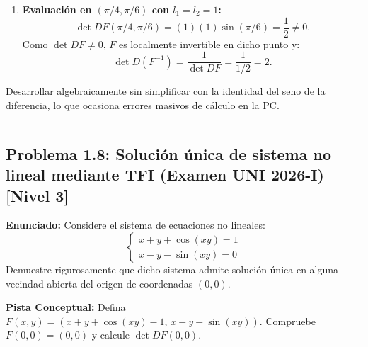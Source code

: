 \documentclass[11pt,a4paper]{article}
\begin{document}
\begin{enumerate}[label=\textbf{\arabic*.}]
\item \textbf{Evaluación en $(\pi/4, \pi/6)$ con $l_1 = l_2 = 1$:}
\begin{equation*}
\det DF(\pi/4, \pi/6) = (1)(1)\sin(\pi/6) = \frac{1}{2} \neq 0.
\end{equation*}
Como $\det DF \neq 0$, $F$ es localmente invertible en dicho punto y:
\begin{equation*}
\det D(F^{-1}) = \frac{1}{\det DF} = \frac{1}{1/2} = 2.
\end{equation*}
\end{enumerate}

\begin{trapbox}
Desarrollar algebraicamente sin simplificar con la identidad del seno de la diferencia, lo que ocasiona errores masivos de cálculo en la PC.
\end{trapbox}

\vspace{0.5cm}
\hrule
\vspace{0.5cm}

\subsection*{Problema 1.8: Solución única de sistema no lineal mediante TFI (Examen UNI 2026-I) \hfill \color{primaryblue}\small[Nivel 3]}

\begin{tcolorbox}[colback=white,colframe=gray!40,arc=1mm,boxrule=0.5pt,left=3mm,right=3mm,top=2mm,bottom=2mm]
\textbf{Enunciado:} Considere el sistema de ecuaciones no lineales:
\begin{equation*}
\begin{cases} x + y + \cos(xy) = 1 \\ x - y - \sin(xy) = 0 \end{cases}
\end{equation*}
Demuestre rigurosamente que dicho sistema admite solución única en alguna vecindad abierta del origen de coordenadas $(0,0)$.
\end{tcolorbox}

\begin{tcolorbox}[colback=yellow!4,colframe=accentamber!70,arc=1mm,boxrule=0.5pt,left=3mm,right=3mm,top=1.5mm,bottom=1.5mm]
\textbf{Pista Conceptual:} Defina $F(x,y) = (x+y+\cos(xy)-1, \, x-y-\sin(xy))$. Compruebe $F(0,0)=(0,0)$ y calcule $\det DF(0,0)$.
\end{tcolorbox}
\end{document}
